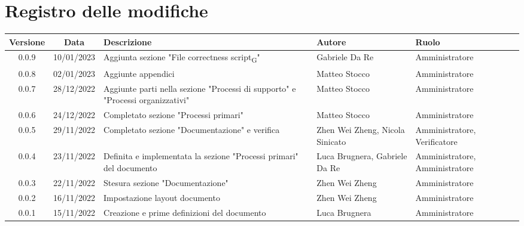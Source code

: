 \section*{Registro delle modifiche}
\begin{center}
\renewcommand\tabularxcolumn[1]{>{\Centering}m{#1}}
\begin{tabularx}{\textwidth}{| c | c | X | X | X |} 
\hline
 \textbf{Versione} & \textbf{Data} & \textbf{Descrizione} & \textbf{Autore} & \textbf{Ruolo}\\
 \hline
 0.0.9 & 10/01/2023 & Aggiunta sezione "File correctness script\textsubscript{G}" & Gabriele Da Re & Amministratore\\
 \hline
 0.0.8 & 02/01/2023 & Aggiunte appendici & Matteo Stocco & Amministratore\\
 \hline
 0.0.7 & 28/12/2022 & Aggiunte parti nella sezione "Processi di supporto" e "Processi organizzativi" & Matteo Stocco & Amministratore\\
 \hline
 0.0.6 & 24/12/2022 & Completato sezione "Processi primari" & Matteo Stocco & Amministratore\\
 \hline
 0.0.5 & 29/11/2022 & Completato sezione "Documentazione" e verifica & Zhen Wei Zheng, Nicola Sinicato & Amministratore, Verificatore\\
 \hline
 0.0.4 & 23/11/2022 &  Definita e implementata la sezione "Processi primari" del documento & Luca Brugnera, Gabriele Da Re & Amministratore, Amministratore\\
 \hline
 0.0.3 & 22/11/2022 & Stesura sezione "Documentazione" & Zhen Wei Zheng & Amministratore\\
 \hline
 0.0.2 & 16/11/2022 & Impostazione layout documento & Zhen Wei Zheng & Amministratore\\
 \hline
 0.0.1 & 15/11/2022 & Creazione e prime definizioni del documento & Luca Brugnera & Amministratore\\
 \hline
\end{tabularx}
\end{center}
